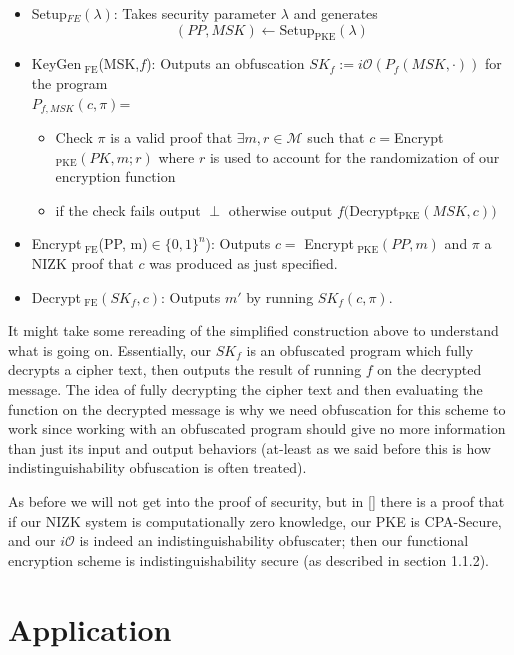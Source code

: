 \documentclass[12pt,twoside]{reedthesis}
\begin{document}
    \begin{itemize}
    \item Setup$_{ FE}(\lambda)$: Takes security parameter $\lambda$ and generates
     $$(PP, MSK) \leftarrow \text{Setup}_{\text{PKE}}(\lambda)$$
     \item KeyGen$_\text{ FE}$(MSK,$f$): Outputs an obfuscation $SK_f := i\mathcal{O}(P_f(MSK, \cdot))$ for the program 
     \\ $P_{f,MSK}(c,\pi)$=
     \begin{itemize}
     \item Check $\pi$ is a valid proof that $\exists m,r \in \mathcal{M}$ such that $c =$Encrypt$_\text{PKE}(PK,m;r)$ where $r$ is used to account for the randomization of our encryption function
     \item if the check fails output $\perp$ otherwise output $f($Decrypt$_\text{PKE}(MSK,c))$
     \end{itemize}
     \item Encrypt$_\text{ FE}$(PP, m)$\in \{ 0,1 \}^n$): Outputs $c =$ Encrypt$_\text{ PKE}(PP, m)$ and $\pi$ a NIZK proof that $c$ was produced as just specified.
     \item Decrypt$_\text{ FE}(SK_f,c)$: Outputs $m'$ by running $SK_f(c,\pi)$.

    
    \end{itemize}
    \par It might take some rereading of the simplified construction above to understand what is going on. Essentially, our $SK_f$ is an obfuscated program which fully decrypts a cipher text, then outputs the result of running $f$ on the decrypted message. The idea of fully decrypting the cipher text and then evaluating the function on the decrypted message is why we need obfuscation for this scheme to work since working with an obfuscated program should give no more information than just its input and output behaviors (at-least as we said before this is how indistinguishability obfuscation is often treated). 
    \par As before we will not get into the proof of security, but in [\cite{Garg:2013}] there is a proof that if our NIZK system is computationally zero knowledge, our PKE is CPA-Secure, and our $i\mathcal{O}$ is indeed an indistinguishability obfuscater; then our functional encryption scheme is indistinguishability secure (as described in section 1.1.2).
    
    
    \section{Application}
    
\end{document}
